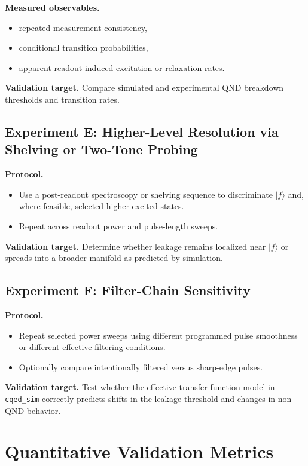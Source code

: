\documentclass[11pt]{article}
\begin{document}
\textbf{Measured observables.}
\begin{itemize}[leftmargin=2em]
    \item repeated-measurement consistency,
    \item conditional transition probabilities,
    \item apparent readout-induced excitation or relaxation rates.
\end{itemize}

\textbf{Validation target.}
Compare simulated and experimental QND breakdown thresholds and transition rates.

\subsection{Experiment E: Higher-Level Resolution via Shelving or Two-Tone Probing}

\textbf{Protocol.}
\begin{itemize}[leftmargin=2em]
    \item Use a post-readout spectroscopy or shelving sequence to discriminate $|f\rangle$
    and, where feasible, selected higher excited states.
    \item Repeat across readout power and pulse-length sweeps.
\end{itemize}

\textbf{Validation target.}
Determine whether leakage remains localized near $|f\rangle$ or spreads into a broader
manifold as predicted by simulation.

\subsection{Experiment F: Filter-Chain Sensitivity}

\textbf{Protocol.}
\begin{itemize}[leftmargin=2em]
    \item Repeat selected power sweeps using different programmed pulse smoothness or
    different effective filtering conditions.
    \item Optionally compare intentionally filtered versus sharp-edge pulses.
\end{itemize}

\textbf{Validation target.}
Test whether the effective transfer-function model in \texttt{cqed\_sim} correctly predicts
shifts in the leakage threshold and changes in non-QND behavior.

\section{Quantitative Validation Metrics}
\end{document}
